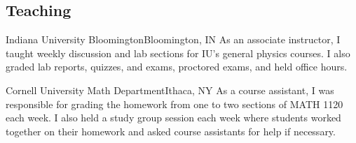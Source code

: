\documentclass[11pt,a4paper,sans]{moderncv}        %
\begin{document}
\subsection{Teaching}

{Indiana University Bloomington}{Bloomington, IN}{}{
As an associate instructor, I taught weekly discussion and lab sections for IU's general physics courses.
I also graded lab reports, quizzes, and exams, proctored exams, and held office hours.
}

{Cornell University Math Department}{Ithaca, NY}{}{
As a course assistant, I was responsible for grading the homework from one to two sections of MATH 1120 each week.
I also held a study group session each week where students worked together on their homework and asked course assistants for help if necessary.
}


% 
% 
\end{document}
